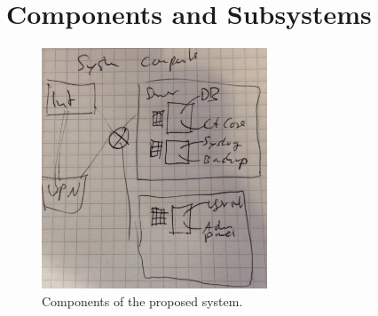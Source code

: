 \documentclass[a4paper, toc=index, 12pt, DIV14, twoside, BCOR2cm, headsepline, numbers=noenddot, bibliography=totoc]{scrbook}
\begin{document}
\section{Components and Subsystems}
\begin{figure}[H]
  \centering
    \includegraphics[width=0.6\textwidth]{images/systemcomponents.jpg}  
  \caption{Components of the proposed system.}
  \label{systemcomponents}
\end{figure}
\end{document}

